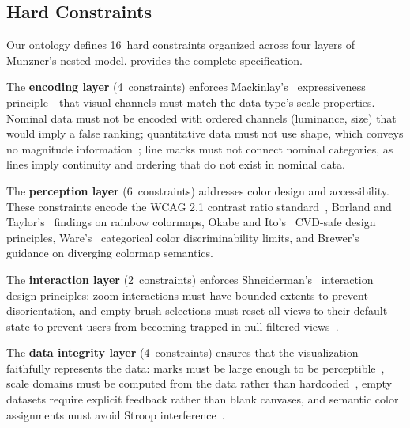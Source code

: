 \documentclass[final,5p,times,twocolumn]{elsarticle}
\begin{document}
\subsection{Hard Constraints}

Our ontology defines 16~hard constraints organized across four layers of Munzner's nested model.  provides the complete specification.

The \textbf{encoding layer} (4~constraints) enforces Mackinlay's~\cite{mackinlay1986automating} expressiveness principle---that visual channels must match the data type's scale properties. Nominal data must not be encoded with ordered channels (luminance, size) that would imply a false ranking; quantitative data must not use shape, which conveys no magnitude information~\cite{stevens1946theory}; line marks must not connect nominal categories, as lines imply continuity and ordering that do not exist in nominal data.

The \textbf{perception layer} (6~constraints) addresses color design and accessibility. These constraints encode the WCAG 2.1 contrast ratio standard~\cite{wcag21}, Borland and Taylor's~\cite{borland2007rainbow} findings on rainbow colormaps, Okabe and Ito's~\cite{okabe2008color} CVD-safe design principles, Ware's~\cite{ware2004information} categorical color discriminability limits, and Brewer's~\cite{borland2007rainbow} guidance on diverging colormap semantics.

The \textbf{interaction layer} (2~constraints) enforces Shneiderman's~\cite{shneiderman1996eyes} interaction design principles: zoom interactions must have bounded extents to prevent disorientation, and empty brush selections must reset all views to their default state to prevent users from becoming trapped in null-filtered views~\cite{heer2012interactive}.

The \textbf{data integrity layer} (4~constraints) ensures that the visualization faithfully represents the data: marks must be large enough to be perceptible~\cite{ware2004information}, scale domains must be computed from the data rather than hardcoded~\cite{kindlmann2014algebraic}, empty datasets require explicit feedback rather than blank canvases, and semantic color assignments must avoid Stroop interference~\cite{lin2013selecting}.
\end{document}
